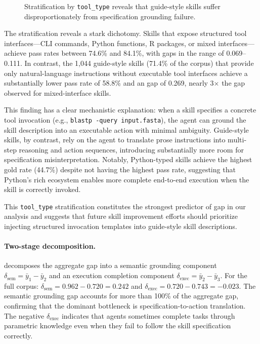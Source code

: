\begin{figure}[t]
\caption{Stratification by \texttt{tool\_type} reveals that guide-style skills suffer disproportionately from specification grounding failure.}
\label{fig:tool_type}
\end{figure}

The stratification reveals a stark dichotomy.
Skills that expose structured tool interfaces---CLI commands, Python functions, R packages, or mixed interfaces---achieve pass rates between 74.6\% and 84.1\%, with \rbu gaps in the range of 0.069--0.111.
In contrast, the 1,044 guide-style skills (71.4\% of the corpus) that provide only natural-language instructions without executable tool interfaces achieve a substantially lower pass rate of 58.8\% and an \rbu gap of 0.269, nearly 3$\times$ the gap observed for mixed-interface skills.

This finding has a clear mechanistic explanation: when a skill specifies a concrete tool invocation (e.g., \texttt{blastp -query input.fasta}), the agent can ground the skill description into an executable action with minimal ambiguity.
Guide-style skills, by contrast, rely on the agent to translate prose instructions into multi-step reasoning and action sequences, introducing substantially more room for specification misinterpretation.
Notably, Python-typed skills achieve the highest gold rate (44.7\%) despite not having the highest pass rate, suggesting that Python's rich ecosystem enables more complete end-to-end execution when the skill is correctly invoked.

This \texttt{tool\_type} stratification constitutes the strongest predictor of \rbu gap in our analysis and suggests that future skill improvement efforts should prioritize injecting structured invocation templates into guide-style skill descriptions.

\paragraph{Two-stage decomposition.}
 decomposes the aggregate \rbu gap into a semantic grounding component $\delta_{\text{sem}} = \bar{y}_1 - \bar{y}_2$ and an execution completion component $\delta_{\text{exec}} = \bar{y}_2 - \bar{y}_3$.
For the full corpus: $\delta_{\text{sem}} = 0.962 - 0.720 = 0.242$ and $\delta_{\text{exec}} = 0.720 - 0.743 = -0.023$.
The semantic grounding gap accounts for more than 100\% of the aggregate \rbu gap, confirming that the dominant bottleneck is specification-to-action translation.
The negative $\delta_{\text{exec}}$ indicates that agents sometimes complete tasks through parametric knowledge even when they fail to follow the skill specification correctly.

